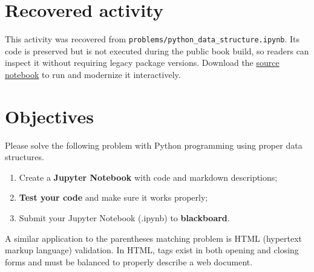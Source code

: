 \documentclass[
  letterpaper,
]{scrbook}
\providecommand{\tightlist}{%
  \setlength{\itemsep}{0pt}\setlength{\parskip}{0pt}}
\begin{document}

\section*{Recovered
activity}\label{sec-lab-python-data-structures-assignment}


\begin{tcolorbox}[enhanced jigsaw, arc=.35mm, bottomrule=.15mm, bottomtitle=1mm, breakable, colback=white, colbacktitle=quarto-callout-note-color!10!white, colframe=quarto-callout-note-color-frame, coltitle=black, left=2mm, leftrule=.75mm, opacityback=0, opacitybacktitle=0.6, rightrule=.15mm, title=\textcolor{quarto-callout-note-color}{\faInfo}\hspace{0.5em}{Historical source and execution note}, titlerule=0mm, toprule=.15mm, toptitle=1mm]

This activity was recovered from
\texttt{problems/python\_data\_structure.ipynb}. Its code is preserved
but is not executed during the public book build, so readers can inspect
it without requiring legacy package versions. Download the
\href{../notebooks/python-data-structures-assignment.ipynb}{source
notebook} to run and modernize it interactively.

\end{tcolorbox}

\section*{Objectives}\label{objectives}


Please solve the following problem with Python programming using proper
data structures.

\begin{enumerate}
\def\labelenumi{\arabic{enumi}.}
\tightlist
\item
  Create a \textbf{Jupyter Notebook} with code and markdown
  descriptions;
\item
  \textbf{Test your code} and make sure it works properly;
\item
  Submit your Jupyter Notebook (.ipynb) to \textbf{blackboard}.
\end{enumerate}

A similar application to the parentheses matching problem is HTML
(hypertext markup language) validation. In HTML, tags exist in both
opening and closing forms and must be balanced to properly describe a
web document.
\end{document}
